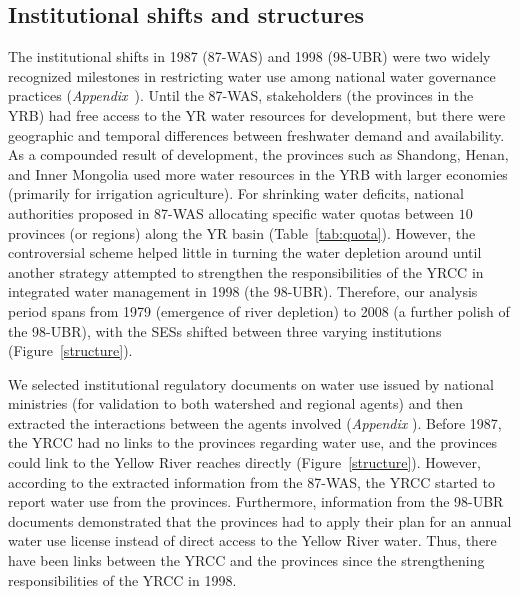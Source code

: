 
\subsection{Institutional shifts and structures}
\label{results-1}

The institutional shifts in 1987 (87-WAS) and 1998 (98-UBR) were two widely recognized milestones in restricting water use among national water governance practices (\textit{Appendix}~).
Until the 87-WAS, stakeholders (the provinces in the YRB) had free access to the YR water resources for development, but there were geographic and temporal differences between freshwater demand and availability.
As a compounded result of development, the provinces such as Shandong, Henan, and Inner Mongolia used more water resources in the YRB with larger economies (primarily for irrigation agriculture).
For shrinking water deficits, national authorities proposed in 87-WAS allocating specific water quotas between $10$ provinces (or regions) along the YR basin (Table~\ref{tab:quota}).
However, the controversial scheme helped little in turning the water depletion around until another strategy attempted to strengthen the responsibilities of the YRCC in integrated water management in 1998 (the 98-UBR).
Therefore, our analysis period spans from 1979 (emergence of river depletion) to 2008 (a further polish of the 98-UBR), with the SESs shifted between three varying institutions (Figure~\ref{structure}).

We selected institutional regulatory documents on water use issued by national ministries (for validation to both watershed and regional agents) and then extracted the interactions between the agents involved (\textit{Appendix }).
Before 1987, the YRCC had no links to the provinces regarding water use, and the provinces could link to the Yellow River reaches directly (Figure~\ref{structure}).
However, according to the extracted information from the 87-WAS, the YRCC started to report water use from the provinces.
Furthermore, information from the 98-UBR documents demonstrated that the provinces had to apply their plan for an annual water use license instead of direct access to the Yellow River water.
Thus, there have been links between the YRCC and the provinces since the strengthening responsibilities of the YRCC in 1998.

